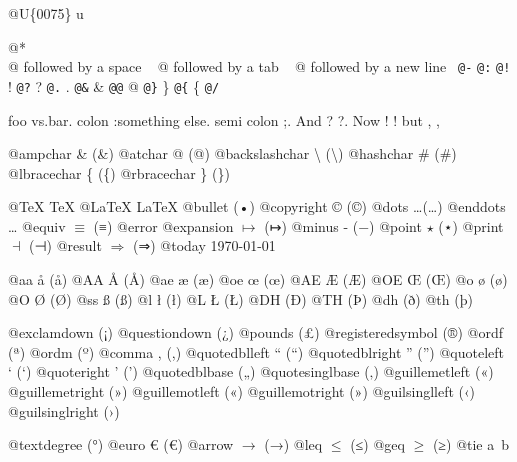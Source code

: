 \documentclass{book}
\renewcommand{\_}{\Texinfounderscore\discretionary{}{}{}}
\begin{document}
@U\{0075\} u

@* \leavevmode{}\\
@ followed by a space
\ {}
@ followed by a tab
\ {}
@ followed by a new line
\ {}\texttt{@-} \-{}
\texttt{@:} \@
\texttt{@!} \@!
\texttt{@?} \@?
\texttt{@.} \@.
\texttt{@\&} \&
\texttt{@@} @
\texttt{@\}} \}
\texttt{@\{} \{
\texttt{@/} 

foo vs.\@ bar. 
colon :\@And something else.
semi colon ;\@.
And ? ?\@.
Now ! !\@@
but , ,\@

@ampchar \& (\&)
@atchar @ (@)
@backslashchar \textbackslash{} (\textbackslash{})
@hashchar \# (\#)
@lbracechar \{ (\{)
@rbracechar \} (\})

@TeX \TeX{}
@LaTeX \LaTeX{}
@bullet \textbullet{} (•)
@copyright \copyright{} (©)
@dots \dots{}\@ (…)
@enddots \dots{}
@equiv $\equiv{}$ (≡)
@error 
@expansion $\mapsto{}$ (↦)
@minus - (−)
@point $\star{}$ (⋆)
@print $\dashv{}$ (⊣)
@result $\Rightarrow{}$ (⇒)
@today \today{}

@aa \aa{} (å)
@AA \AA{} (Å)
@ae \ae{} (æ)
@oe \oe{} (œ)
@AE \AE{} (Æ)
@OE \OE{} (Œ)
@o \o{} (ø)
@O \O{} (Ø)
@ss \ss{} (ß)
@l \l{} (ł)
@L \L{} (Ł)
@DH \DH{} (Ð)
@TH \TH{} (Þ)
@dh \dh{} (ð)
@th \th{} (þ)

@exclamdown \textexclamdown{} (¡)
@questiondown \textquestiondown{} (¿)
@pounds \textsterling{} (£)
@registeredsymbol \circledR{} (®)
@ordf \textordfeminine{} (ª)
@ordm \textordmasculine{} (º)
@comma , (,)
@quotedblleft \textquotedblleft{} (“)
@quotedblright \textquotedblright{} (”)
@quoteleft \textquoteleft{} (‘)
@quoteright \textquoteright{} (’)
@quotedblbase \quotedblbase{} („)
@quotesinglbase \quotesinglbase{} (‚)
@guillemetleft \guillemotleft{} («)
@guillemetright \guillemotright{} (»)
@guillemotleft \guillemotleft{} («)
@guillemotright \guillemotright{} (»)
@guilsinglleft \guilsinglleft{} (‹)
@guilsinglright \guilsinglright{} (›)

@textdegree \textdegree{} (°)
@euro \euro{} (€)
@arrow $\rightarrow{}$ (→)
@leq $\leq{}$ (≤)
@geq $\geq{}$ (≥)
@tie a~b
\end{document}
